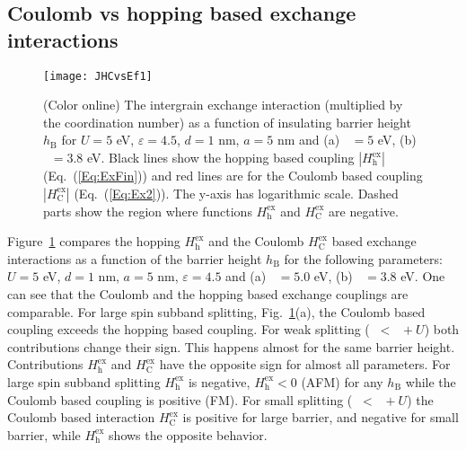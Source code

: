 \documentclass[aps,prb,amsmath,amssymb,twocolumn,superscriptaddress,showpacs,floatfix]{revtex4-1}
\DeclareMathOperator{\Ji}{\mathit J_{\mathrm{sd}}}
\DeclareMathOperator{\Ef}{E_\mathrm F}
\begin{document}
\subsection{Coulomb vs hopping based exchange interactions}


\begin{figure}
\texttt{[image: JHCvsEf1]}
\caption{(Color online) The intergrain exchange interaction (multiplied by the coordination number) as a function
of insulating barrier height $h_\mathrm B$ for $U=5$ eV, $\varepsilon=4.5$, $d=1$ nm, $a=5$ nm and (a) $\Ji=5$ eV, (b) $\Ji=3.8$ eV.
Black lines show the hopping based coupling $|H^\mathrm{ex}_\mathrm{h}|$ (Eq.~(\ref{Eq:ExFin})) and
red lines are for the Coulomb based coupling $|H^\mathrm{ex}_{\mathrm C}|$ (Eq.~(\ref{Eq:Ex2})). The y-axis has logarithmic scale. Dashed parts show the region where functions
$H^\mathrm{ex}_\mathrm{h}$ and $H^\mathrm{ex}_{\mathrm C}$ are negative.} \label{Fig:JHCvsEf1}
\end{figure}

Figure~\ref{Fig:JHCvsEf1} compares the hopping $H^\mathrm{ex}_\mathrm{h}$ and
the Coulomb $H^\mathrm{ex}_{\mathrm C}$ based exchange interactions
as a function of the barrier height $h_\mathrm B$ for the following parameters:
$U=5$ eV, $d=1$ nm, $a=5$ nm, $\varepsilon=4.5$ and (a) $\Ji=5.0$ eV, (b) $\Ji=3.8$ eV.
One can see that the Coulomb and the hopping based exchange couplings are comparable.
For large spin subband splitting, Fig.~\ref{Fig:JHCvsEf1}(a), the Coulomb based coupling exceeds
the hopping based coupling. For weak splitting ($\Ji<\Ef+U$) both contributions
change their sign. This happens almost for the same barrier height.
Contributions $H^\mathrm{ex}_\mathrm{h}$ and $H^\mathrm{ex}_{\mathrm C}$
have the opposite sign for almost all parameters.
For large spin subband splitting $H^\mathrm{ex}_\mathrm{h}$ is negative,
$H^\mathrm{ex}_\mathrm{h}<0$ (AFM) for any $h_\mathrm B$ while the Coulomb
based coupling is positive (FM). For
small splitting ($\Ji<\Ef+U$) the Coulomb based interaction $H^\mathrm{ex}_{\mathrm C}$
is positive for large barrier, and negative for small
barrier, while $H^\mathrm{ex}_\mathrm{h}$ shows the opposite behavior.
\end{document}
